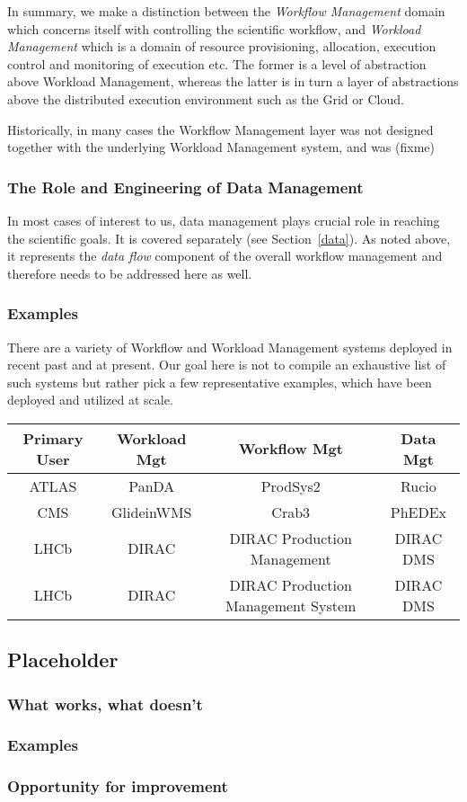 In summary, we make a distinction between the \textit{Workflow Management} domain which concerns itself with controlling the scientific workflow, and \textit{Workload Management} which
is a domain of resource provisioning, allocation, execution control and monitoring of execution etc. The former is a level of abstraction above Workload Management, whereas the latter is in
turn a layer of abstractions above the distributed execution environment such as the Grid or Cloud.

Historically, in many cases the Workflow Management layer was not designed together with the underlying Workload Management system, and was (fixme)

\subsubsection{The Role and Engineering of Data Management}
In most cases of interest to us, data management plays crucial role in reaching the scientific goals. It is covered separately (see Section~\ref{data}). As noted above, it represents the \textit{data flow} component of the overall workflow management and therefore needs to be addressed here as well.

\subsubsection{Examples}
\label{wms_examples}
There are a variety of Workflow and Workload Management systems deployed in recent past and at present. Our goal here is not to compile an exhaustive list of such systems but rather pick a few representative examples, which have been deployed and utilized at scale.


\begin{center}
  \begin{tabular}{ c | c | c | c }
    \hline
    Primary User & Workload Mgt & Workflow Mgt & Data Mgt\\ \hline
    ATLAS & PanDA & ProdSys2 & Rucio\\ \hline
    CMS  & GlideinWMS & Crab3 & PhEDEx\\ \hline
    LHCb  & DIRAC & DIRAC Production Management & DIRAC DMS\\ \hline

    LHCb  & DIRAC & DIRAC Production Management System & DIRAC DMS\\ \hline

    \hline
  \end{tabular}
\end{center}

\subsection{Placeholder}
\subsubsection{What works, what doesn't}
\subsubsection{Examples}
\subsubsection{Opportunity for improvement}
